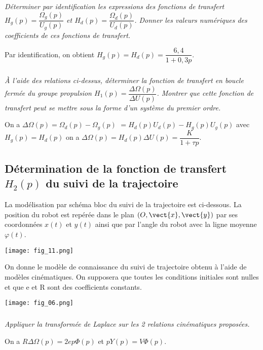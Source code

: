 \begin{multicols}{2}
\subparagraph{}
\textit{Déterminer par identification les expressions des fonctions de transfert $H_g(p) = \dfrac{\Omega_g(p)}{U_g(p)}$ et
$H_d(p) = \dfrac{\Omega_d(p)}{U_d(p)}$.  Donner les valeurs numériques des coefficients de ces fonctions de transfert. }
\ifprof
\begin{corrige}
Par identification, on obtient $H_g(p)=H_d(p)=\dfrac{6,4}{1+0,3p}$.
\end{corrige}
\else
\fi

\subparagraph{}
\textit{À l’aide des relations ci-dessus, déterminer la fonction de transfert en boucle fermée du groupe propulsion 
$H_1(p)=\dfrac{\Delta\Omega(p)}{\Delta U(p)}$. 
Montrer que cette fonction de transfert peut se mettre sous la forme d’un système du premier ordre.}
\ifprof
\begin{corrige}
On a $\Delta\Omega(p) = \Omega_d (p) - \Omega_g (p)$
$ = H_d(p) U_d(p)-H_g(p) U_g(p)$ avec $H_g(p)=H_d(p)$ on a 
$\Delta\Omega(p)  = H_d(p)\Delta U(p) = \dfrac{K}{1+\tau p}$.
\end{corrige}
\else
\fi



\subsection*{Détermination de la fonction de transfert $H_2 (p)$ du suivi de la trajectoire}

\ifprof
\else
La modélisation par schéma bloc du suivi de la trajectoire est ci-dessous. La position du robot est repérée dans le plan $\left(O,\vect{x},\vect{y}\right)$ par ses coordonnées $x(t)$ et $y(t)$ ainsi que par l’angle du robot avec la ligne moyenne $\varphi(t)$. 

\begin{center}
\texttt{[image: fig\_11.png]}
\end{center}


On donne le modèle de connaissance du suivi de trajectoire obtenu à l’aide de modèles cinématiques. On supposera que toutes les conditions initiales sont nulles et que e et R sont des coefficients constants. 

\begin{center}
\texttt{[image: fig\_06.png]}
\end{center}

\fi

\subparagraph{}
\textit{Appliquer la transformée de Laplace sur les 2 relations cinématiques proposées. }
\ifprof
\begin{corrige}
On a $R\Delta \Omega(p)=2e p \Phi(p)$ et $pY(p)=V\Phi(p)$.
\end{corrige}
\else
\fi



\end{multicols}
